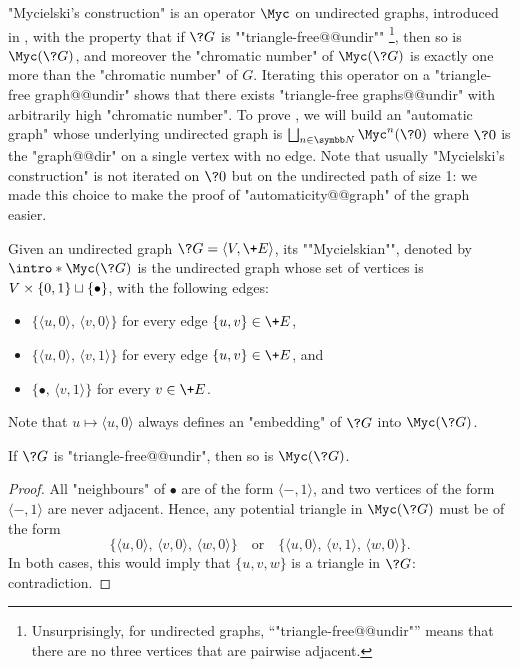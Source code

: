 "Mycielski's construction" is an operator $\Myc$ on undirected graphs,
introduced in \cite{Mycielski55Coloriage}, with the property that if $\?G$ is \AP""triangle-free@@undir""%
\footnote{Unsurprisingly, for undirected graphs, ``"triangle-free@@undir"'' means that there are no
three vertices that are pairwise adjacent.},
then so is $\Myc(\?G)$, and moreover
the "chromatic number" of $\Myc(\?G)$ is exactly one more than the "chromatic number" of $G$.
Iterating this operator on a "triangle-free graph@@undir" shows that there exists
"triangle-free graphs@@undir" with arbitrarily high "chromatic number".
To prove , we will build
an "automatic graph" whose underlying undirected graph is
$\bigdcup_{n\in\N} \Myc^n(\?0)$ where $\?0$ is the "graph@@dir" on a single vertex with no edge.
Note that usually "Mycielski's construction" is not iterated on $\?0$ but on the undirected
path of size 1: we made this choice to make the proof of "automaticity@@graph" of the graph
easier.

\begin{definition}
	Given an undirected graph $\?G = \langle V, \+E \rangle$, its \AP""Mycielskian"",
	denoted by \AP$\intro*\Myc(\?G)$ is the undirected graph whose set of vertices is
	$V\times\{0,1\} \sqcup \{\bullet\}$, with the following edges:
	\begin{itemize}
		\item $\{\langle u, 0 \rangle,\, \langle v, 0 \rangle\}$
			for every edge $\{ u,v \} \in \+E$,
		\item $\{\langle u, 0 \rangle,\, \langle v, 1 \rangle\}$
			for every edge $\{ u,v \} \in \+E$, and
		\item $\{ \bullet,\, \langle v, 1 \rangle\}$
			for every $v \in \+E$.
	\end{itemize}
\end{definition}

Note that $u \mapsto \langle u,0\rangle$ always defines an "embedding" of
$\?G$ into $\Myc(\?G)$.

\begin{property}
	\label{prop:triangle-free}
	If $\?G$ is "triangle-free@@undir", then so is $\Myc(\?G)$.
\end{property}

\begin{proof}
	All "neighbours" of $\bullet$ are of the form $\langle -, 1\rangle$,
	and two vertices of the form $\langle -, 1\rangle$ are never adjacent.
	Hence, any potential triangle in $\Myc(\?G)$ must be of the form
	\[
	\{
		\langle u, 0 \rangle,\,
		\langle v, 0 \rangle,\,
		\langle w, 0 \rangle
	\}
	\quad\text{or}\quad
	\{
		\langle u, 0 \rangle,\,
		\langle v, 1 \rangle,\,
		\langle w, 0 \rangle
	\}.
	\]
	In both cases, this would imply that $\{u,v,w\}$ is a triangle in $\?G$:
	contradiction.
\end{proof}

